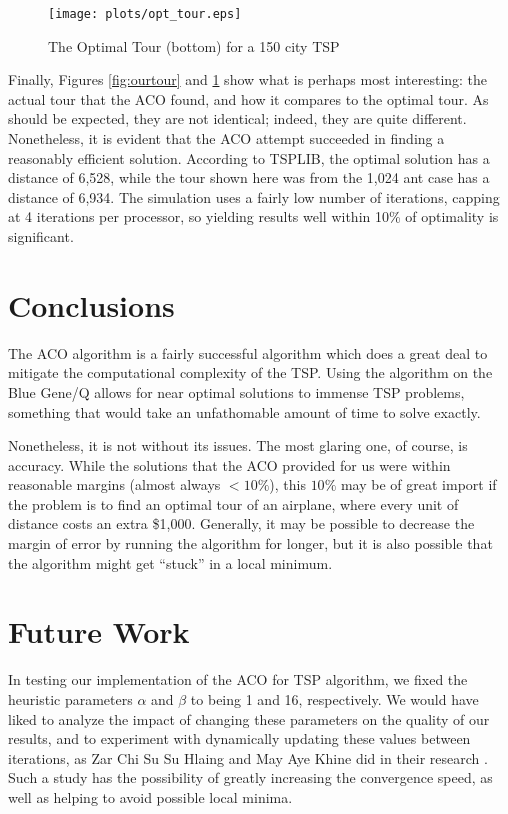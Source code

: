 \documentclass[twocolumn]{article}
\begin{document}
\begin{figure}[t]
  \centering
  \texttt{[image: plots/opt\_tour.eps]}
  \caption{The Optimal Tour (bottom) for a 150 city TSP} 
  \label{fig:opttour}
\end{figure}

Finally, Figures \ref{fig:ourtour} and \ref{fig:opttour} show what is perhaps 
most interesting: the actual tour that the ACO found, and how it compares to 
the optimal tour. As should be expected, they are not identical; indeed, 
they are quite different. Nonetheless, it is evident that the ACO attempt succeeded
in finding a reasonably efficient solution. According to TSPLIB, the optimal solution
has a distance of 6,528, while the tour shown here was from the 1,024 ant case
has a distance of 6,934. The simulation uses a fairly low number of iterations, 
capping at 4 iterations per processor, so yielding results well within 10\% of
optimality is significant. 

\section{Conclusions}

The ACO algorithm is a fairly successful algorithm which does a great deal to 
mitigate the computational complexity of the TSP. Using the algorithm on the
Blue Gene/Q allows for near optimal solutions to immense TSP problems, something
that would take an unfathomable amount of time to solve exactly. 

Nonetheless, it is not without its issues. The most glaring one, of course,
is accuracy. While the solutions that the ACO provided for us were within
reasonable margins (almost always $<10\%$), this $10\%$ may be of great 
import if the problem is to find an optimal tour of an airplane, where every
unit of distance costs an extra \$1,000. Generally, it may be possible to 
decrease the margin of error by running the algorithm for longer, but 
it is also possible that the algorithm might get ``stuck'' in a local 
minimum. 

\section{Future Work}

In testing our implementation of the ACO for TSP algorithm, we fixed the 
heuristic parameters $\alpha$ and $\beta$ to being 1 and 16, respectively. We 
would have liked to analyze the impact of changing these parameters on the
quality of our results, and to experiment with dynamically
updating these values between iterations, as Zar Chi Su Su Hlaing and May Aye 
Khine did in their research \cite{ipcsit:aco}. Such a study has the possibility
of greatly increasing the convergence speed, as well as helping to avoid 
possible local minima. 
\end{document}
